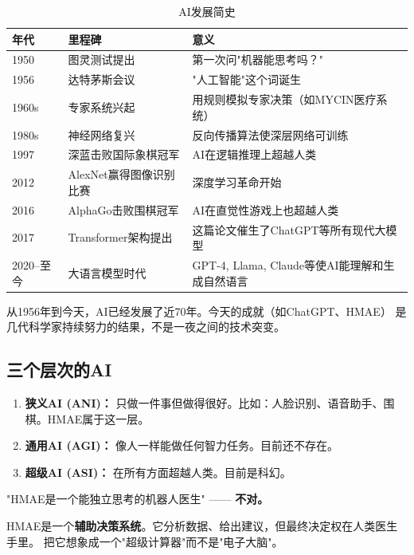 \documentclass[11pt,a4paper]{ctexart}
\begin{document}
\begin{table}[H]
\centering
\small
\begin{tabular}{lll}
\toprule
\textbf{年代} & \textbf{里程碑} & \textbf{意义} \\
\midrule
1950 & 图灵测试提出 & 第一次问"机器能思考吗？" \\
1956 & 达特茅斯会议 & "人工智能"这个词诞生 \\
1960s & 专家系统兴起 & 用规则模拟专家决策（如MYCIN医疗系统） \\
1980s & 神经网络复兴 & 反向传播算法使深层网络可训练 \\
1997 & 深蓝击败国际象棋冠军 & AI在逻辑推理上超越人类 \\
2012 & AlexNet赢得图像识别比赛 & 深度学习革命开始 \\
2016 & AlphaGo击败围棋冠军 & AI在直觉性游戏上也超越人类 \\
2017 & Transformer架构提出 & 这篇论文催生了ChatGPT等所有现代大模型 \\
2020--至今 & 大语言模型时代 & GPT-4, Llama, Claude等使AI能理解和生成自然语言 \\
\bottomrule
\end{tabular}
\caption{AI发展简史}
\end{table}

\begin{keybox}[AI不是突然出现的]
从1956年到今天，AI已经发展了近70年。今天的成就（如ChatGPT、HMAE）
是几代科学家持续努力的结果，不是一夜之间的技术突变。
\end{keybox}

\subsection{三个层次的AI}

\begin{enumerate}[nosep]
\item \textbf{狭义AI (ANI)：} 只做一件事但做得很好。比如：人脸识别、语音助手、围棋。HMAE属于这一层。
\item \textbf{通用AI (AGI)：} 像人一样能做任何智力任务。目前还不存在。
\item \textbf{超级AI (ASI)：} 在所有方面超越人类。目前是科幻。
\end{enumerate}

\begin{warnbox}[常见误区]
"HMAE是一个能独立思考的机器人医生" —— \textbf{不对。}

HMAE是一个\textbf{辅助决策系统}。它分析数据、给出建议，但最终决定权在人类医生手里。
把它想象成一个"超级计算器"而不是"电子大脑"。
\end{warnbox}
\end{document}
